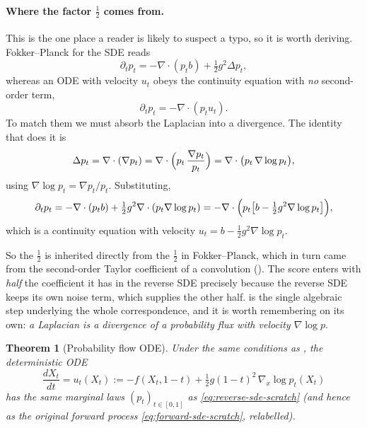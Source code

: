 \documentclass[11pt,a4paper]{report}
\newtheorem{theorem}{Theorem}[chapter]
\theoremstyle{definition}
\theoremstyle{remark}
\begin{document}
\paragraph{Where the factor $\tfrac12$ comes from.} This is the one place a
reader is likely to suspect a typo, so it is worth deriving.
Fokker--Planck for the SDE reads
\[
\partial_tp_t = -\nabla\cdot(p_tb) + \tfrac12g^2\Delta p_t ,
\]
whereas an ODE with velocity $u_t$ obeys the continuity equation with
\emph{no} second-order term,
\[
\partial_tp_t = -\nabla\cdot(p_tu_t).
\]
To match them we must absorb the Laplacian into a divergence. The identity
that does it is
\begin{equation}
\label{eq:laplacian-as-div}
\Delta p_t = \nabla\cdot(\nabla p_t)
= \nabla\cdot\Bigl(p_t\,\frac{\nabla p_t}{p_t}\Bigr)
= \nabla\cdot\bigl(p_t\,\nabla\log p_t\bigr),
\end{equation}
using $\nabla\log p_t=\nabla p_t/p_t$. Substituting,
\[
\partial_tp_t
= -\nabla\cdot(p_tb) + \tfrac12g^2\nabla\cdot(p_t\nabla\log p_t)
= -\nabla\cdot\Bigl(p_t\bigl[b - \tfrac12g^2\nabla\log p_t\bigr]\Bigr),
\]
which is a continuity equation with velocity
$u_t = b - \tfrac12g^2\nabla\log p_t$.

So the $\tfrac12$ is inherited directly from the $\tfrac12$ in
Fokker--Planck, which in turn came from the second-order Taylor coefficient
of a convolution (). The score enters with
\emph{half} the coefficient it has in the reverse SDE precisely because the
reverse SDE keeps its own noise term, which supplies the other half.
 is the single algebraic step underlying the whole
correspondence, and it is worth remembering on its own: \emph{a Laplacian is
a divergence of a probability flux with velocity $\nabla\log p$}.

\begin{theorem}[Probability flow ODE]
\label{thm:pf-ode-scratch}
Under the same conditions as , the deterministic ODE
\begin{equation}
\label{eq:pf-ode-scratch}
\frac{dX_t}{dt} = u_t(X_t) := -f(X_t,1-t) + \tfrac12 g(1-t)^2\,\nabla_x\log p_t(X_t)
\end{equation}
has the \emph{same} marginal laws $(p_t)_{t\in[0,1]}$ as
\eqref{eq:reverse-sde-scratch} (and hence as the original forward
process \eqref{eq:forward-sde-scratch}, relabelled).
\end{theorem}
\end{document}
